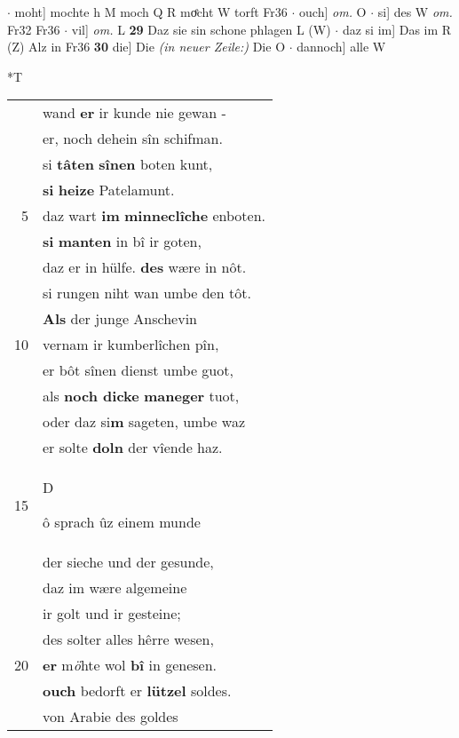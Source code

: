\documentclass[8pt,a4paper,notitlepage]{article}
\begin{document}
\begin{table}[ht]
\begin{minipage}[t]{0.5\linewidth}
$\cdot$ moht] mochte h M moch Q R moͤcht W torft Fr36  $\cdot$ ouch] \textit{om.} O  $\cdot$ si] des W \textit{om.} Fr32 Fr36  $\cdot$ vil] \textit{om.} L \textbf{29} Daz sie sin schone phlagen L (W)  $\cdot$ daz si im] Das im R (Z) Alz in Fr36 \textbf{30} die] Die \textit{(in neuer Zeile:)} Die O  $\cdot$ dannoch] alle W \newline
\end{minipage}
\hspace{0.5cm}
\begin{minipage}[t]{0.5\linewidth}
\small
\begin{center}*T
\end{center}
\begin{tabular}{rl}
 & wand \textbf{er} ir kunde nie gewan -\\ 
 & er, noch dehein sîn schifman.\\ 
 & si \textbf{tâten} \textbf{sînen} boten kunt,\\ 
 & \textbf{si} \textbf{heize} Patelamunt.\\ 
5 & daz wart \textbf{im} \textbf{minneclîche} enboten.\\ 
 & \textbf{si} \textbf{manten} in bî ir goten,\\ 
 & daz er in hülfe. \textbf{des} wære in nôt.\\ 
 & si rungen niht wan umbe den tôt.\\ 
 & \textbf{Als} der junge Anschevin\\ 
10 & vernam ir kumberlîchen pîn,\\ 
 & er bôt sînen dienst umbe guot,\\ 
 & als \textbf{noch dicke} \textbf{maneger} tuot,\\ 
 & oder daz si\textbf{m} sageten, umbe waz\\ 
 & er solte \textbf{doln} der vîende haz.\\ 
15 & \begin{large}D\end{large}ô sprach ûz einem munde\\ 
 & der sieche und der gesunde,\\ 
 & daz im wære algemeine\\ 
 & ir golt und ir gesteine;\\ 
 & des solter alles hêrre wesen,\\ 
20 & \textbf{er} m\textit{ö}hte wol \textbf{bî} in genesen.\\ 
 & \textbf{ouch} bedorft er \textbf{lützel} soldes.\\ 
 & von Arabie des goldes\\ 

\end{tabular}
\end{minipage}
\end{table}
\end{document}
